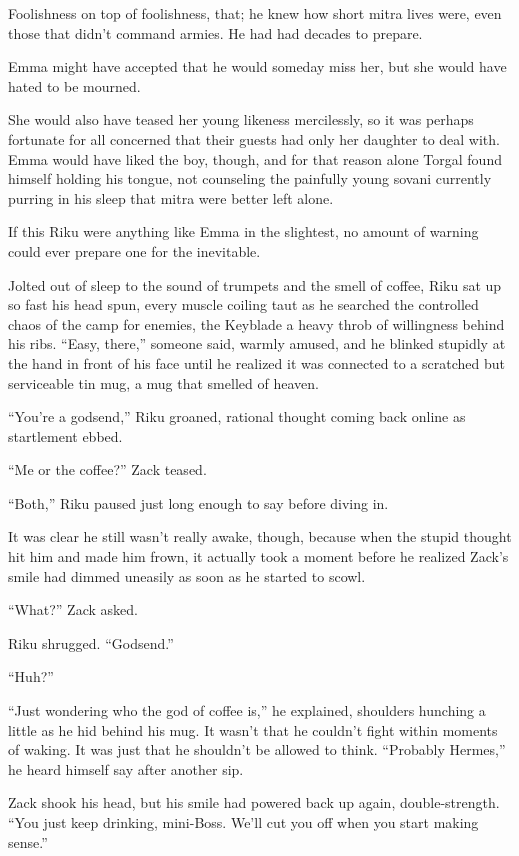 Foolishness on top of foolishness, that; he knew how short mitra lives were, even those that didn't command armies. He had had decades to prepare.

Emma might have accepted that he would someday miss her, but she would have hated to be mourned.

She would also have teased her young likeness mercilessly, so it was perhaps fortunate for all concerned that their guests had only her daughter to deal with. Emma would have liked the boy, though, and for that reason alone Torgal found himself holding his tongue, not counseling the painfully young sovani currently purring in his sleep that mitra were better left alone.

If this Riku were anything like Emma in the slightest, no amount of warning could ever prepare one for the inevitable.


\scenechange


Jolted out of sleep to the sound of trumpets and the smell of coffee, Riku sat up so fast his head spun, every muscle coiling taut as he searched the controlled chaos of the camp for enemies, the Keyblade a heavy throb of willingness behind his ribs. ``Easy, there,'' someone said, warmly amused, and he blinked stupidly at the hand in front of his face until he realized it was connected to a scratched but serviceable tin mug, a mug that smelled of heaven.

``You're a godsend,'' Riku groaned, rational thought coming back online as startlement ebbed.

``Me or the coffee?'' Zack teased.

``Both,'' Riku paused just long enough to say before diving in.

It was clear he still wasn't really awake, though, because when the stupid thought hit him and made him frown, it actually took a moment before he realized Zack's smile had dimmed uneasily as soon as he started to scowl.

``What?'' Zack asked.

Riku shrugged. ``Godsend.''

``Huh?''

``Just wondering who the god of coffee is,'' he explained, shoulders hunching a little as he hid behind his mug. It wasn't that he couldn't fight within moments of waking. It was just that he shouldn't be allowed to think. ``Probably Hermes,'' he heard himself say after another sip.

Zack shook his head, but his smile had powered back up again, double-strength. ``You just keep drinking, mini-Boss. We'll cut you off when you start making sense.''

